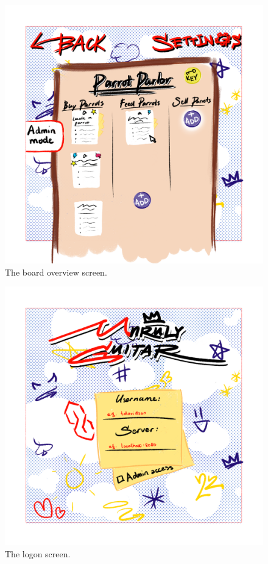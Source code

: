 \begin{figure}
    \includegraphics{mocks/hue_mock_board_overview.png}
    \caption{The board overview screen.}
\end{figure}
\begin{figure}
    \includegraphics{mocks/hue_mock_logon.png}
    \caption{The logon screen.}
\end{figure}
